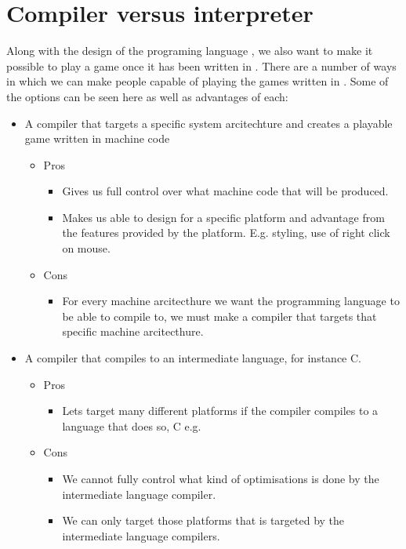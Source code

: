 \section{Compiler versus interpreter}

Along with the design of the programing language \productname{}, we also want to make it possible to play a game once it has been written in \productname{}. There are a number of ways in which we can make people capable of playing the games written in \productname{}. Some of the options can be seen here as well as advantages of each:
\begin{itemize}
\item A \productname{} compiler that targets a specific system arcitechture and creates a playable game written in machine code
	\begin{itemize}
	\item Pros
		\begin{itemize}	
		\item Gives us full control over what machine code that will be produced.
		\item Makes us able to design for a specific platform and advantage from the features provided by the platform. E.g. styling, use of right click on mouse.
		\end{itemize}
	\item Cons
		\begin{itemize}	
		\item For every machine arcitecthure we want the \productname{} programming language to be able to compile to, we must make a compiler that targets that specific machine arcitecthure.
		\end{itemize}
	\end{itemize}
\item A \productname{} compiler that compiles to an intermediate language, for instance C.
	\begin{itemize}
	\item Pros
		\begin{itemize}
		\item Lets \productname{} target many different platforms if the compiler compiles to a language that does so, C e.g.
		\end{itemize}
	\item Cons
		\begin{itemize}	
		\item We cannot fully control what kind of optimisations is done by the intermediate language compiler.
		\item We can only target those platforms that is targeted by the intermediate language compilers.

\end{itemize}
\end{itemize}
\end{itemize}
